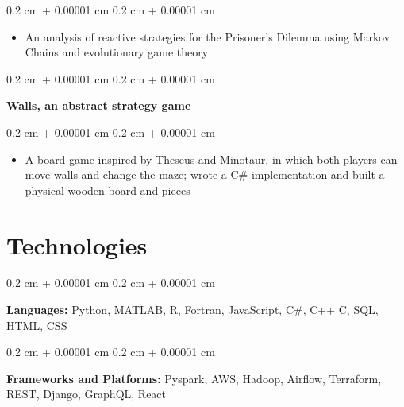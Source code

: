 \documentclass[10pt, letterpaper]{article}
\newenvironment{highlights}{
    \begin{itemize}[
        topsep=0.10 cm,
        parsep=0.10 cm,
        partopsep=0pt,
        itemsep=0pt,
        leftmargin=0.4 cm + 10pt
    ]
}{
    \end{itemize}
} %
\newenvironment{onecolentry}{
    \begin{adjustwidth}{
        0.2 cm + 0.00001 cm
    }{
        0.2 cm + 0.00001 cm
    }
}{
    \end{adjustwidth}
} %
\begin{document}
        \vspace{0.10 cm}
        \begin{onecolentry}
            \begin{highlights}
                \item An analysis of reactive strategies for the Prisoner's Dilemma using Markov Chains and evolutionary game theory
            \end{highlights}
        \end{onecolentry}


        \vspace{0.2 cm}

        \begin{onecolentry}
            \textbf{Walls, an abstract strategy game}
        \end{onecolentry}

        \vspace{0.10 cm}
        \begin{onecolentry}
            \begin{highlights}
                \item A board game inspired by Theseus and Minotaur, in which both players can move walls and change the maze; wrote a C\# implementation and built a physical wooden board and pieces
            \end{highlights}
        \end{onecolentry}



    
    \section{Technologies}



        
        \begin{onecolentry}
            \textbf{Languages:} Python, MATLAB, R, Fortran, JavaScript, C\#, C++ C, SQL, HTML, CSS
        \end{onecolentry}

        \vspace{0.2 cm}

        \begin{onecolentry}
            \textbf{Frameworks and Platforms:} Pyspark, AWS, Hadoop, Airflow, Terraform, REST, Django, GraphQL, React
        \end{onecolentry}


    
\end{document}
